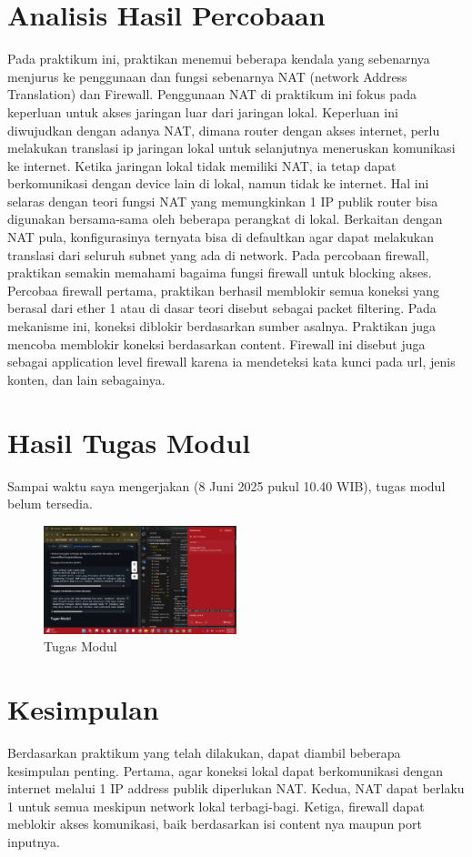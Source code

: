 \section{Analisis Hasil Percobaan}
Pada praktikum ini, praktikan menemui beberapa kendala yang sebenarnya menjurus ke penggunaan dan fungsi sebenarnya NAT (network Address Translation) dan Firewall. Penggunaan NAT di praktikum ini fokus pada keperluan untuk akses jaringan luar dari jaringan lokal. Keperluan ini diwujudkan dengan adanya NAT, dimana router dengan akses internet, perlu melakukan translasi ip jaringan lokal untuk selanjutnya meneruskan komunikasi ke internet. Ketika jaringan lokal tidak memiliki NAT, ia tetap dapat berkomunikasi dengan device lain di lokal, namun tidak ke internet. Hal ini selaras dengan teori fungsi NAT yang memungkinkan 1 IP publik router bisa digunakan bersama-sama oleh beberapa perangkat di lokal. Berkaitan dengan NAT pula, konfigurasinya ternyata bisa di defaultkan agar dapat melakukan translasi dari seluruh subnet yang ada di network. Pada percobaan firewall, praktikan semakin memahami bagaima fungsi firewall untuk blocking akses.  Percobaa firewall pertama, praktikan berhasil memblokir semua koneksi yang berasal dari ether 1 atau di dasar teori disebut sebagai packet filtering. Pada mekanisme ini, koneksi diblokir berdasarkan sumber asalnya. Praktikan juga mencoba memblokir koneksi berdasarkan content. Firewall ini disebut juga sebagai application level firewall karena ia mendeteksi kata kunci pada url, jenis konten, dan lain sebagainya.

\section{Hasil Tugas Modul}
Sampai waktu saya mengerjakan (8 Juni 2025 pukul 10.40 WIB), tugas modul belum tersedia. 
\begin{figure}[h]
    \centering
    \includegraphics[width=0.5\textwidth]{tumod/notumod.png}
    \caption{Tugas Modul}
    \label{fig:tugas-modul}
\end{figure}

\section{Kesimpulan}
Berdasarkan praktikum yang telah dilakukan, dapat diambil beberapa kesimpulan penting. Pertama, agar koneksi lokal dapat berkomunikasi dengan internet melalui 1 IP address publik diperlukan NAT. Kedua, NAT dapat berlaku 1 untuk semua meskipun network lokal terbagi-bagi. Ketiga, firewall dapat meblokir akses komunikasi, baik berdasarkan isi content nya maupun port inputnya.

